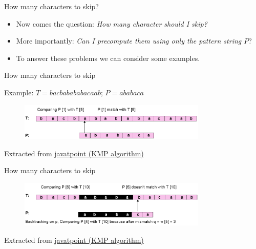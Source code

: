 \documentclass[10pt,xcolor={table,dvipsnames},t]{beamer}
\begin{document}
\begin{frame}{How many characters to skip?}
  \begin{itemize}
    \item Now comes the question: \textit{How many character should I skip?} 
    \item More importantly: \textit{Can I precompute them using only the pattern string $P$}?
    \item To answer these problems we can consider some examples.
  \end{itemize}
\end{frame}

\begin{frame}{How many characters to skip}
  \begin{exampleblock}{Example: $T=bacbabababacaab$; $P=ababaca$}
    \begin{figure}
      \includegraphics[width=0.8\textwidth]{img/kmp-eg1-01.png}
    \end{figure}
  Extracted from \href{https://www.javatpoint.com/daa-knuth-morris-pratt-algorithm}{javatpoint (KMP algorithm)}
  \end{exampleblock}
\end{frame}

\begin{frame}{How many characters to skip}
  \begin{figure}
    \includegraphics[width=0.8\textwidth]{img/kmp-eg1-02.png}
  \end{figure}
  Extracted from \href{https://www.javatpoint.com/daa-knuth-morris-pratt-algorithm}{javatpoint (KMP algorithm)}
\end{frame}
\end{document}
